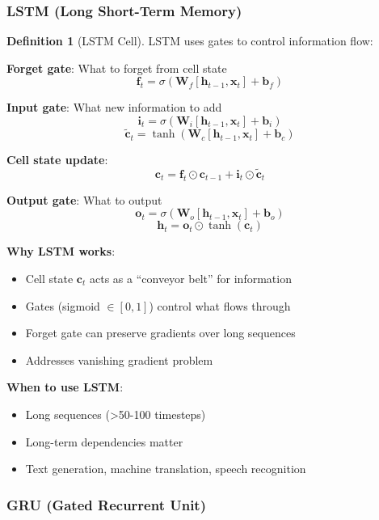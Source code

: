 \documentclass[11pt,twoside]{article}
\numberwithin{equation}{section}
\newcommand{\vect}[1]{\bm{#1}}
\theoremstyle{plain}
\theoremstyle{definition}
\newtheorem{definition}[theorem]{Definition}
\theoremstyle{remark}
\newenvironment{keyidea}{
  \begin{tcolorbox}[colback=yellow!5!white,
                    colframe=yellow!50!black,
                    title=Key Idea,
                    breakable,
                    enhanced,
                    sharp corners,
                    boxrule=0.8pt,
                    left=6pt, right=6pt, top=6pt, bottom=6pt]
}{
  \end{tcolorbox}
}
\begin{document}
\subsubsection{LSTM (Long Short-Term Memory)}

\begin{definition}[LSTM Cell]
LSTM uses gates to control information flow:

\textbf{Forget gate}: What to forget from cell state
\[
\vect{f}_t = \sigma(\vect{W}_f[\vect{h}_{t-1}, \vect{x}_t] + \vect{b}_f)
\]

\textbf{Input gate}: What new information to add
\[
\vect{i}_t = \sigma(\vect{W}_i[\vect{h}_{t-1}, \vect{x}_t] + \vect{b}_i)
\]
\[
\tilde{\vect{c}}_t = \tanh(\vect{W}_c[\vect{h}_{t-1}, \vect{x}_t] + \vect{b}_c)
\]

\textbf{Cell state update}:
\[
\vect{c}_t = \vect{f}_t \odot \vect{c}_{t-1} + \vect{i}_t \odot \tilde{\vect{c}}_t
\]

\textbf{Output gate}: What to output
\[
\vect{o}_t = \sigma(\vect{W}_o[\vect{h}_{t-1}, \vect{x}_t] + \vect{b}_o)
\]
\[
\vect{h}_t = \vect{o}_t \odot \tanh(\vect{c}_t)
\]
\end{definition}

\begin{keyidea}
\textbf{Why LSTM works}:
\begin{itemize}
\item Cell state $\vect{c}_t$ acts as a ``conveyor belt'' for information
\item Gates (sigmoid $\in [0,1]$) control what flows through
\item Forget gate can preserve gradients over long sequences
\item Addresses vanishing gradient problem
\end{itemize}

\textbf{When to use LSTM}:
\begin{itemize}
\item Long sequences (>50-100 timesteps)
\item Long-term dependencies matter
\item Text generation, machine translation, speech recognition
\end{itemize}
\end{keyidea}

\subsubsection{GRU (Gated Recurrent Unit)}
\end{document}
